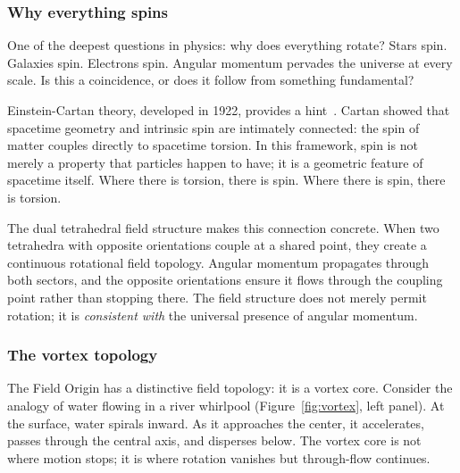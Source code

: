\documentclass[aps,prd,preprint,superscriptaddress,showpacs,preprintnumbers,amsmath,amssymb,nofootinbib]{revtex4-2}
\begin{document}
\subsubsection*{Why everything spins}

One of the deepest questions in physics: why does everything rotate? Stars spin. Galaxies spin. Electrons spin. Angular momentum pervades the universe at every scale. Is this a coincidence, or does it follow from something fundamental?

Einstein-Cartan theory, developed in 1922, provides a hint~\cite{hehl1976}. Cartan showed that spacetime geometry and intrinsic spin are intimately connected: the spin of matter couples directly to spacetime torsion. In this framework, spin is not merely a property that particles happen to have; it is a geometric feature of spacetime itself. Where there is torsion, there is spin. Where there is spin, there is torsion.

The dual tetrahedral field structure makes this connection concrete. When two tetrahedra with opposite orientations couple at a shared point, they create a continuous rotational field topology. Angular momentum propagates through both sectors, and the opposite orientations ensure it flows through the coupling point rather than stopping there. The field structure does not merely permit rotation; it is \emph{consistent with} the universal presence of angular momentum.

\subsubsection*{The vortex topology}

The Field Origin has a distinctive field topology: it is a vortex core. Consider the analogy of water flowing in a river whirlpool (Figure~\ref{fig:vortex}, left panel). At the surface, water spirals inward. As it approaches the center, it accelerates, passes through the central axis, and disperses below. The vortex core is not where motion stops; it is where rotation vanishes but through-flow continues.
\end{document}
